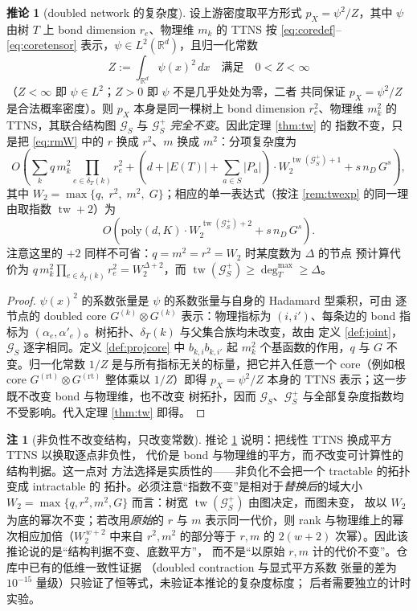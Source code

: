 \documentclass[a4paper,11pt]{article}
\theoremstyle{definition}
\newtheorem{corollary}{推论}
\newtheorem{remark}{注}
\newcommand{\R}{\mathbb R}
\newcommand{\1}{\mathbf 1}
\newcommand{\tw}{\operatorname{tw}}
\newcommand{\Gcal}{\mathcal G}
\begin{document}
\begin{corollary}[doubled network 的复杂度]
\label{cor:squared}
设上游密度取平方形式 $p_X=\psi^2/Z$，其中 $\psi$ 由树 $T$ 上 bond
dimension $r_e$、物理维 $m_k$ 的 TTNS 按 \eqref{eq:coredef}--\eqref{eq:coretensor}
表示，$\psi\in L^2(\R^d)$，且归一化常数
\begin{equation}
\label{eq:Zdef}
Z:=\int_{\R^d}\psi(x)^2\,dx
\quad\text{满足}\quad
0<Z<\infty
\end{equation}
（$Z<\infty$ 即 $\psi\in L^2$；$Z>0$ 即 $\psi$ 不是几乎处处为零，二者
共同保证 $p_X=\psi^2/Z$ 是合法概率密度）。则 $p_X$ 本身是同一棵树上
bond dimension $r_e^2$、物理维 $m_k^2$ 的 TTNS，其联合结构图
$\Gcal_S$ 与 $\Gcal_S^{+}$ \emph{完全不变}。因此定理 \ref{thm:tw} 的
指数不变，只是把 \eqref{eq:rmW} 中的 $r$ 换成 $r^2$、$m$ 换成
$m^2$：分项复杂度为
\[
O\!\left(
\textstyle\sum_{k}q\,m_k^2\prod_{e\in\delta_T(k)}r_e^2
+
(d+|E(T)|+\textstyle\sum_{a\in S}|P_a|)\cdot W_2^{\,\tw(\Gcal_S^{+})+1}
+
s\,n_D\,G^{s}
\right),
\]
其中 $W_2=\max\{q,\;r^2,\;m^2,\;G\}$；相应的单一表达式（按注
\ref{rem:twexp} 的同一理由取指数 $\tw+2$）为
\[
O\!\left(
\mathrm{poly}(d,K)\cdot
W_2^{\,\tw(\Gcal_S^{+})+2}
+
s\,n_D\,G^{s}
\right).
\]
注意这里的 $+2$ 同样不可省：$q=m^2=r^2=W_2$ 时某度数为 $\Delta$ 的节点
预计算代价为 $q\,m_k^2\prod_{e\in\delta_T(k)}r_e^2=W_2^{\Delta+2}$，而
$\tw(\Gcal_S^{+})\ge\deg_T^{\max}\ge\Delta$。
\end{corollary}

\begin{proof}
$\psi(x)^2$ 的系数张量是 $\psi$ 的系数张量与自身的 Hadamard 型乘积，可由
逐节点的 doubled core
$G^{(k)}\otimes G^{(k)}$ 表示：物理指标为 $(i,i')$、每条边的 bond 指标为
$(\alpha_e,\alpha'_e)$。树拓扑、$\delta_T(k)$ 与父集合族均未改变，故由
定义 \ref{def:joint}，$\Gcal_S$ 逐字相同。定义 \ref{def:projcore} 中
$b_{k,i}b_{k,i'}$ 起 $m_k^2$ 个基函数的作用，$q$ 与 $G$ 不变。归一化常数
$1/Z$ 是与所有指标无关的标量，把它并入任意一个 core（例如根 core
$G^{(\mathrm{rt})}\otimes G^{(\mathrm{rt})}$ 整体乘以 $1/Z$）即得
$p_X=\psi^2/Z$ 本身的 TTNS 表示；这一步既不改变 bond 与物理维，也不改变
树拓扑，因而 $\Gcal_S$、$\Gcal_S^{+}$ 与全部复杂度指数均不受影响。代入定理
\ref{thm:tw} 即得。
\end{proof}

\begin{remark}[非负性不改变结构，只改变常数]
\label{rem:squaredstruct}
推论 \ref{cor:squared} 说明：把线性 TTNS 换成平方 TTNS 以换取逐点非负性，
代价是 bond 与物理维的平方，而\emph{不}改变可计算性的结构判据。这一点对
方法选择是实质性的——非负化不会把一个 tractable 的拓扑变成 intractable 的
拓扑。必须注意“指数不变”是相对于\emph{替换后}的域大小
$W_2=\max\{q,r^2,m^2,G\}$ 而言：树宽 $\tw(\Gcal_S^{+})$ 由图决定，而图未变，
故以 $W_2$ 为底的幂次不变；若改用\emph{原始}的 $r$ 与 $m$ 表示同一代价，则
rank 与物理维上的幂次相应加倍（$W_2^{\,w+2}$ 中来自 $r^2,m^2$ 的部分等于
$r,m$ 的 $2(w+2)$ 次幂）。因此该推论说的是“结构判据不变、底数平方”，
而不是“以原始 $r,m$ 计的代价不变”。仓库中已有的低维一致性证据
（doubled contraction 与显式平方系数
张量的差为 $10^{-15}$ 量级）只验证了恒等式，未验证本推论的复杂度标度；
后者需要独立的计时实验。
\end{remark}
\end{document}
